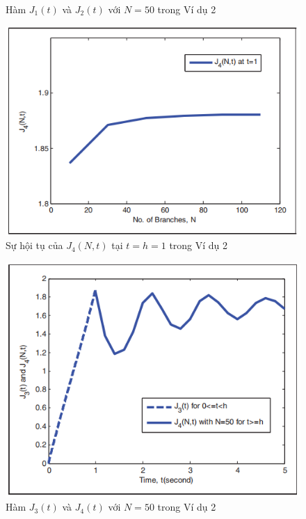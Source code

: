 \begin{vd}
\begin{figure}[h!]
	\caption[Hàm $J_1(t)$ và $J_2(t)$ với $N = 50$ trong Ví dụ 2 ]{Hàm $J_1(t)$ và $J_2(t)$ với $N = 50$ trong Ví dụ 2}
	\label{fig:hinh-17}
\end{figure}
\begin{figure}[h!]
	\centering
	\includegraphics[scale= 0.7]{"./Hinh/Hinh18"}
	\caption[Sự hội tụ của $J_4(N,t)$ tại $t = h = 1$ trong Ví dụ 2 ]{Sự hội tụ của $J_4(N,t)$ tại $t = h = 1$ trong Ví dụ 2}
	\label{fig:hinh-18}
\end{figure}
\begin{figure}[h!]
	\centering
	\includegraphics[scale= 0.7]{"./Hinh/Hinh19"}
	\caption[Hàm $J_3(t)$ và $J_4(t)$ với $N = 50$ trong Ví dụ 2 ]{Hàm $J_3(t)$ và $J_4(t)$ với $N = 50$ trong Ví dụ 2}

\end{figure}
\end{vd}
